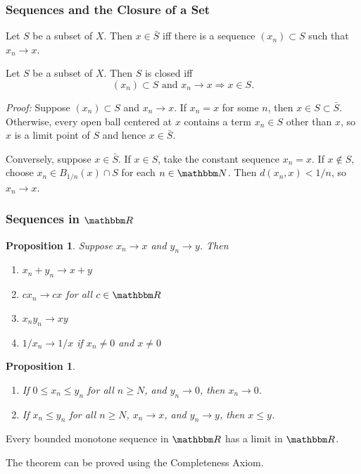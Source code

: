 \documentclass[9pt,aspectratio=169]{beamer}
\newcommand{\RR}{\mathbbm R}
\newcommand{\NN}{\mathbbm N}
\renewcommand{\implies}{\Rightarrow}
\newtheorem{proposition}[theorem]{Proposition}
\begin{document}
\begin{frame}
    \frametitle{Sequences and the Closure of a Set}
    \begin{theorem}
        Let $S$ be a subset of $X$. Then $x \in \bar S$ iff there is a
        sequence $(x_n) \subset S$ such that $x_n \to x$.
    \end{theorem}
    \begin{corollary}
        Let $S$ be a subset of $X$. Then $S$ is closed iff
        \begin{equation*}
            (x_n) \subset S \text{ and } x_n \to x \implies x \in S.
        \end{equation*}
    \end{corollary}
    \emph{Proof:} Suppose $(x_n) \subset S$ and $x_n \to x$. If $x_n=x$ for
    some $n$, then $x\in S\subset\bar S$. Otherwise, every open ball centered
    at $x$ contains a term $x_n\in S$ other than $x$, so $x$ is a limit point
    of $S$ and hence $x\in\bar S$.

    Conversely, suppose $x \in \bar S$. If $x\in S$, take the constant
    sequence $x_n=x$. If $x\notin S$, choose $x_n\in B_{1/n}(x)\cap S$ for
    each $n\in\NN$. Then $d(x_n,x)<1/n$, so $x_n\to x$.
\end{frame}


\begin{frame}[allowframebreaks]
    \frametitle{Sequences in $\RR$}
    \begin{proposition}
        Suppose $x_n \to x$ and $y_n \to y$. Then
        \begin{enumerate}
            \item $x_n + y_n \to x + y$
            \item $c x_n \to cx$ for all $c \in \RR$
            \item $x_n y_n \to xy$
            \item $1/x_n \to 1/x$ if $x_n \neq 0$ and $x \neq 0$
        \end{enumerate}
    \end{proposition}
    \begin{proposition}
        \begin{enumerate}
            \item If $0 \leq x_n \leq y_n$ for all $n \geq N$, and $y_n \to
            0$, then $x_n \to 0$.
            \item If $x_n \leq y_n$ for all $n \geq N$, $x_n \to x$, and $y_n
            \to y$, then $x \leq y$.
        \end{enumerate}
    \end{proposition}
    \framebreak
    \begin{theorem}
        Every bounded monotone sequence in $\RR$ has a limit in $\RR$.
    \end{theorem}
    The theorem can be proved using the Completeness Axiom.
\end{frame}
\end{document}
